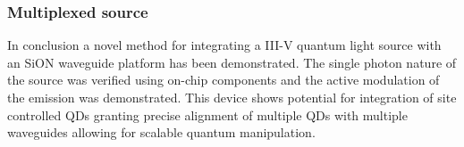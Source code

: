 \subsubsection{Multiplexed source}

In conclusion a novel method for integrating a III-V quantum light source with
an SiON waveguide platform has been demonstrated. The single photon nature of
the source was verified using on-chip components and the active modulation of
the emission was demonstrated. This device shows potential for integration of
site controlled \cite{juska2013towards} QDs granting precise alignment of
multiple QDs with multiple waveguides allowing for scalable quantum
manipulation.
